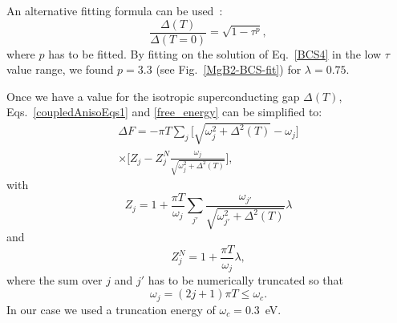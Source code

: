 \documentclass[final,3p,times,twocolumn]{elsarticle}
\begin{document}
An alternative fitting formula can be used~\cite{Choi2003}:
\begin{equation}\label{deltaTeq}
\frac{\Delta(T)}{\Delta(T=0)} =\sqrt{1-\tau^p},
\end{equation}
where $p$ has to be fitted. By fitting on the solution of Eq.~\eqref{BCS4} in the low $\tau$ value range, we found $p=3.3$ (see Fig.~\eqref{MgB2-BCS-fit}) for $\lambda=0.75$.

Once we have a value for the isotropic superconducting gap $\Delta(T)$, Eqs.~\eqref{coupledAnisoEqs1} and \eqref{free_energy} can be simplified to:
\begin{multline}
\Delta F = -\pi T \sum_j \Big[ \sqrt{\omega_j^2+\Delta^2(T)}-\omega_j \Big]\\
\times \Big[ Z_j - Z_j^N \frac{\omega_j}{\sqrt{\omega_j^2+\Delta^2(T)}} \Big],
\end{multline}
with
\begin{equation}
Z_j = 1+\frac{\pi T}{\omega_j} \sum_{j'} \frac{\omega_{j'}}{\sqrt{\omega_{j'}^2+\Delta^2(T)}}\lambda
\end{equation}
and
\begin{equation}
Z_j^N = 1 + \frac{\pi T}{\omega_j}\lambda,
\end{equation}
where the sum over $j$ and $j'$ has to be numerically truncated so that
\begin{equation}
\omega_j = (2j+1)\pi T \le \omega_c.
\end{equation}
In our case we used a truncation energy of $\omega_c = 0.3$~eV.




 


%
\end{document}
